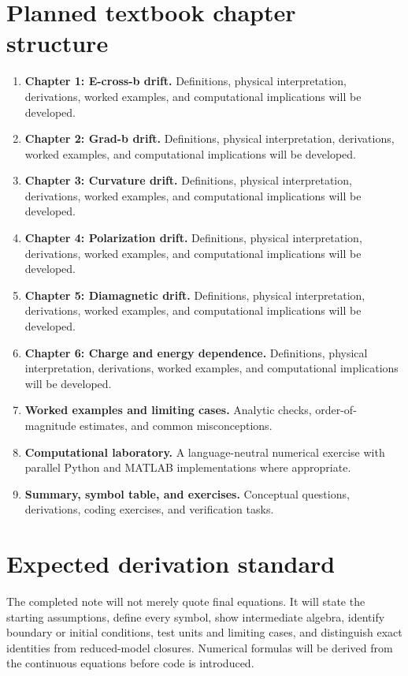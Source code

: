 \documentclass[11pt]{article}
\begin{document}
\section{Planned textbook chapter structure}
\begin{enumerate}[leftmargin=1.8em]
\item \textbf{Chapter 1: E-cross-b drift.} Definitions, physical interpretation, derivations, worked examples, and computational implications will be developed.
\item \textbf{Chapter 2: Grad-b drift.} Definitions, physical interpretation, derivations, worked examples, and computational implications will be developed.
\item \textbf{Chapter 3: Curvature drift.} Definitions, physical interpretation, derivations, worked examples, and computational implications will be developed.
\item \textbf{Chapter 4: Polarization drift.} Definitions, physical interpretation, derivations, worked examples, and computational implications will be developed.
\item \textbf{Chapter 5: Diamagnetic drift.} Definitions, physical interpretation, derivations, worked examples, and computational implications will be developed.
\item \textbf{Chapter 6: Charge and energy dependence.} Definitions, physical interpretation, derivations, worked examples, and computational implications will be developed.
\item \textbf{Worked examples and limiting cases.} Analytic checks, order-of-magnitude estimates, and common misconceptions.
\item \textbf{Computational laboratory.} A language-neutral numerical exercise with parallel Python and MATLAB implementations where appropriate.
\item \textbf{Summary, symbol table, and exercises.} Conceptual questions, derivations, coding exercises, and verification tasks.
\end{enumerate}

\section{Expected derivation standard}
The completed note will not merely quote final equations. It will state the starting assumptions, define every symbol, show intermediate algebra, identify boundary or initial conditions, test units and limiting cases, and distinguish exact identities from reduced-model closures. Numerical formulas will be derived from the continuous equations before code is introduced.
\end{document}
